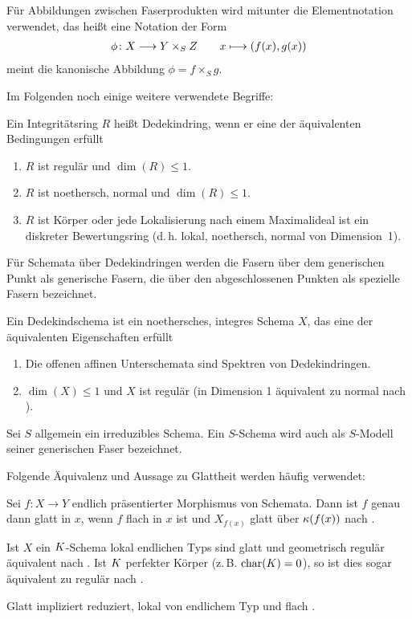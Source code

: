 Für Abbildungen zwischen Faserprodukten wird mitunter die
Elementnotation verwendet, das heißt eine Notation der Form
\begin{gather*}
  \phi\colon X\longrightarrow Y\times_S Z\qquad
  x\longmapsto (f(x),g(x))
\end{gather*}
meint die kanonische Abbildung $\phi=f\times_S g$.

Im Folgenden noch einige weitere verwendete Begriffe:
\begin{Definition}[Dedekindring]\label{def:dedekindring}
  Ein Integritätsring $R$ heißt Dedekindring, wenn er eine der
  äquivalenten Bedingungen erfüllt
  \begin{enumerate}[label=(\roman*)]
  \item $R$ ist regulär und $\dim(R)\leq 1$.
  \item $R$ ist noethersch, normal und $\dim(R)\leq 1$.
  \item $R$ ist Körper oder
    jede Lokalisierung nach einem Maximalideal ist ein diskreter
    Bewertungsring
    (d.\,h. lokal, noethersch, normal von Dimension~1).
  \end{enumerate}
\end{Definition}
Für Schemata über Dedekindringen werden die Fasern über dem
generischen Punkt als generische Fasern, die über den abgeschlossenen
Punkten als spezielle Fasern bezeichnet.
\begin{Definition}[Dedekindschema]
  Ein Dedekindschema ist ein noethersches, integres Schema $X$, das
  eine der äquivalenten Eigenschaften erfüllt
  \begin{enumerate}[label=(\roman*)]
  \item Die offenen affinen Unterschemata sind Spektren von Dedekindringen.
  \item $\dim(X)\leq 1$ und $X$ ist regulär
    (in Dimension 1 äquivalent zu normal nach
    \cite[Corollary 6.39, Proposition 6.40]{wedhorn}).
  \end{enumerate}
\end{Definition}
Sei $S$ allgemein ein irreduzibles Schema. Ein $S$-Schema wird auch als
$S$-Modell seiner generischen Faser bezeichnet.

Folgende Äquivalenz und Aussage zu Glattheit werden häufig verwendet:
\begin{Bemerkung}\label{thm:eigglatt}
  Sei $f\colon X\to Y$ endlich präsentierter Morphismus von Schemata.
  Dann ist $f$ genau dann glatt in $x$, wenn $f$ flach in $x$ ist und
  $X_{f(x)}$ glatt über $\kappa(f(x))$ nach
  \cite[8.5, Proposition 17]{bosch}.
  
  Ist $X$ ein $K$-Schema lokal endlichen Typs sind glatt und
  geometrisch regulär äquivalent nach \cite[Corollary 6.32]{wedhorn}.
  Ist $K$ perfekter Körper (z.\,B. $\operatorname{char}(K)=0$), so ist dies sogar
  äquivalent zu regulär nach \cite[Remark 6.33]{wedhorn}.
    
  Glatt impliziert reduziert, lokal von endlichem Typ und flach
  \cite[für flach s.][Theorem 14.22]{wedhorn}.
\end{Bemerkung}

